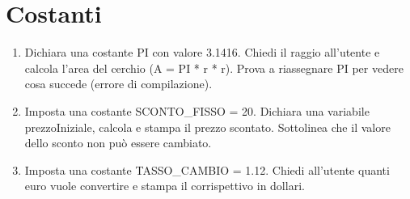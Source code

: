 \documentclass{article}
\begin{document}
\section{Costanti}

\begin{enumerate}
    
    \item Dichiara una costante PI con valore 3.1416. Chiedi il raggio all'utente e calcola l'area del 
    cerchio (A = PI * r * r). Prova a riassegnare PI per vedere cosa succede (errore di compilazione).

    \item Imposta una costante SCONTO\_FISSO = 20. Dichiara una variabile prezzoIniziale, calcola e stampa 
    il prezzo scontato. Sottolinea che il valore dello sconto non può essere cambiato.

    \item Imposta una costante TASSO\_CAMBIO = 1.12. Chiedi all'utente quanti euro vuole convertire e stampa il corrispettivo in dollari.

\end{enumerate}
\end{document}
